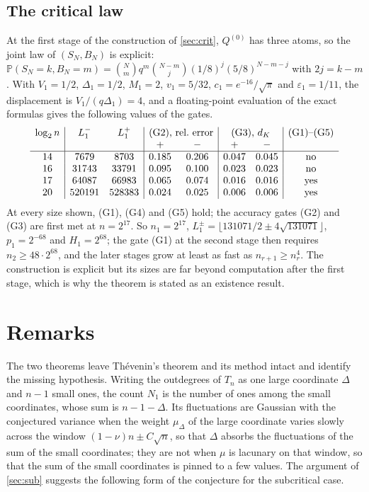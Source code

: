\documentclass[11pt]{amsart}
\theoremstyle{definition}
\newcommand{\Prob}{\mathbb{P}}
\begin{document}
\subsection{The critical law}

At the first stage of the construction of \cref{sec:crit}, $Q^{(0)}$ has three atoms, so the joint law of $(S_N,B_N)$ is explicit: $\Prob(S_N=k,B_N=m)=\binom Nm q^m\binom{N-m}{j}(1/8)^j(5/8)^{N-m-j}$ with $2j=k-m$. With $V_1=1/2$, $\Delta_1=1/2$, $M_1=2$, $v_1=5/32$, $c_1=e^{-16}/\sqrt\pi$ and $\varepsilon_1=1/11$, the displacement is $V_1/(q\Delta_1)=4$, and a floating-point evaluation of the exact formulas gives the following values of the gates.
\[
\begin{array}{c|cc|cc|cc|c}
\log_2n & L_1^- & L_1^+ & \multicolumn{2}{c|}{\text{(G2), rel.\ error}} & \multicolumn{2}{c|}{\text{(G3), }d_K} & \text{(G1)--(G5)}\\
 & & & + & - & + & - \\ \hline
14 & 7679 & 8703 & 0.185 & 0.206 & 0.047 & 0.045 & \text{no}\\
16 & 31743 & 33791 & 0.095 & 0.100 & 0.023 & 0.023 & \text{no}\\
17 & 64087 & 66983 & 0.065 & 0.074 & 0.016 & 0.016 & \text{yes}\\
20 & 520191 & 528383 & 0.024 & 0.025 & 0.006 & 0.006 & \text{yes}
\end{array}
\]
At every size shown, (G1), (G4) and (G5) hold; the accuracy gates (G2) and (G3) are first met at $n=2^{17}$.
So $n_1=2^{17}$, $L_1^\pm=\lfloor 131071/2\pm4\sqrt{131071}\rfloor$, $p_1=2^{-68}$ and $H_1=2^{68}$; the gate (G1) at the second stage then requires $n_2\ge48\cdot2^{68}$, and the later stages grow at least as fast as $n_{r+1}\ge n_r^4$. The construction is explicit but its sizes are far beyond computation after the first stage, which is why the theorem is stated as an existence result.

\section{Remarks}\label{sec:remarks}

The two theorems leave Th\'evenin's theorem and its method intact and identify the missing hypothesis. Writing the outdegrees of $T_n$ as one large coordinate $\Delta$ and $n-1$ small ones, the count $N_1$ is the number of ones among the small coordinates, whose sum is $n-1-\Delta$. Its fluctuations are Gaussian with the conjectured variance when the weight $\mu_\Delta$ of the large coordinate varies slowly across the window $(1-\nu)n\pm C\sqrt n$, so that $\Delta$ absorbs the fluctuations of the sum of the small coordinates; they are not when $\mu$ is lacunary on that window, so that the sum of the small coordinates is pinned to a few values. The argument of \cref{sec:sub} suggests the following form of the conjecture for the subcritical case.
\end{document}
